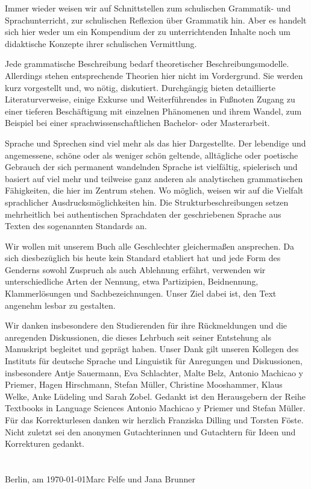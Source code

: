 \begin{refsection}
Immer wieder weisen wir auf Schnittstellen zum schulischen Grammatik- und Sprachunterricht, zur schulischen Reflexion über Grammatik hin. Aber es handelt sich hier weder um ein Kompendium der zu unterrichtenden Inhalte noch um didaktische Konzepte ihrer schulischen Vermittlung. 

Jede grammatische Beschreibung bedarf theoretischer Beschreibungsmodelle. Allerdings stehen entsprechende Theorien hier nicht im Vordergrund. Sie werden kurz vorgestellt und, wo nötig, diskutiert. Durchgängig bieten detaillierte Literaturverweise, einige Exkurse und Weiterführendes in Fußnoten Zugang zu einer tieferen Beschäftigung mit einzelnen Phänomenen und ihrem Wandel, zum Beispiel bei einer sprachwissenschaftlichen Bachelor- oder Masterarbeit.


Sprache und Sprechen sind viel mehr als das hier Dargestellte. Der lebendige und angemessene, schöne oder als weniger schön geltende, alltägliche oder poetische Gebrauch der sich permanent wandelnden Sprache ist vielfältig, spielerisch und basiert auf viel mehr und teilweise ganz anderen als analytischen grammatischen Fähigkeiten, die hier im Zentrum stehen. Wo möglich, weisen wir auf die Vielfalt sprachlicher Ausdrucksmöglichkeiten hin. Die Strukturbeschreibungen setzen mehrheitlich bei authentischen Sprachdaten der geschriebenen Sprache aus Texten des sogenannten Standards an. 

Wir wollen mit unserem Buch alle Geschlechter gleichermaßen ansprechen. Da sich diesbezüglich bis heute kein Standard etabliert hat und jede Form des Genderns sowohl Zuspruch als auch Ablehnung erfährt, verwenden wir unterschiedliche Arten der Nennung, etwa Partizipien, Beidnennung, Klammerlösungen und Sachbezeichnungen. Unser Ziel dabei ist, den Text angenehm lesbar zu gestalten.


Wir danken insbesondere den Studierenden für ihre Rückmeldungen und die anregenden Diskussionen, die dieses Lehrbuch seit seiner Entstehung als Manuskript begleitet und geprägt haben. Unser Dank gilt unseren Kollegen des Instituts für deutsche Sprache und Linguistik für Anregungen und Diskussionen, insbesondere Antje Sauermann, Eva Schlachter, Malte Belz, Antonio Machicao y Priemer, Hagen Hirschmann, Stefan Müller, Christine Mooshammer, Klaus Welke, Anke Lüdeling und Sarah Zobel. Gedankt ist den Herausgebern der Reihe Textbooks in Language Sciences Antonio Machicao y Priemer und Stefan Müller. Für das Korrekturlesen danken wir herzlich Franziska Dilling und Torsten Föste. Nicht zuletzt sei den anonymen Gutachterinnen und Gutachtern für Ideen und Korrekturen gedankt. 
\\
\\
\\


\noindent Berlin, am \today \hfill Marc Felfe und Jana Brunner



\end{refsection}